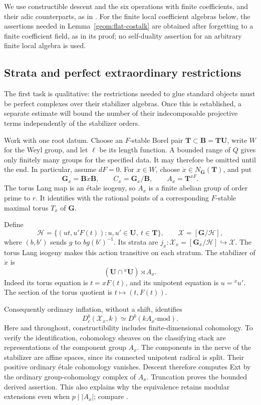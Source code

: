 We use constructible descent and the six operations with finite
coefficients, and their adic counterparts, as in
\cite{LaszloOlssonFinite,LaszloOlssonAdic}.  For the finite local
coefficient algebras below, the assertions needed in
Lemma~\ref{geom:flat-costalk} are obtained after forgetting to a
finite coefficient field, as in its proof; no self-duality assertion
for an arbitrary finite local algebra is used.

\subsection{Strata and perfect extraordinary restrictions}

The first task is qualitative: the restrictions needed to glue
standard objects must be perfect complexes over their stabilizer
algebras.  Once this is established, a separate estimate will bound
the number of their indecomposable projective terms independently
of the stabilizer orders.

Work with one root datum. Choose an \(F\)-stable Borel pair
\(\mathbf T\subset\mathbf B=\mathbf T\mathbf U\), write \(W\) for the
Weyl group, and let \(\ell\) be its length function. A bounded range of
\(Q\) gives only finitely many groups for the specified data. It may
therefore be omitted until the end. In particular, assume \(dF=0\).
For \(x\in W\), choose \(\dot x\in N_{\mathbf G}(\mathbf T)\), and put
\[
 \mathbf G_x=\mathbf B\dot x\mathbf B,
 \qquad C_x=\mathbf G_x/\mathbf B,
 \qquad A_x=\mathbf T^{xF}.
\]
The torus Lang map is an \'etale isogeny, so \(A_x\) is a finite abelian
group of order prime to \(r\). It identifies with the rational points
of a corresponding \(F\)-stable maximal torus \(T_x\) of \(\mathbf G\).

Define
\[
 \mathcal H=
 \{(ut,u'F(t)):u,u'\in\mathbf U,\ t\in\mathbf T\},
 \qquad \mathcal X=[\mathbf G/\mathcal H],
\]
where \((b,b')\) sends \(g\) to \(bg(b')^{-1}\).
Its strata are
\(j_x:\mathcal X_x=[\mathbf G_x/\mathcal H]\hookrightarrow\mathcal X\).
The torus Lang isogeny makes this action transitive on each stratum.
The stabilizer of \(\dot x\) is
\[
 (\mathbf U\cap{}^{\dot x}\mathbf U)\rtimes A_x.
\]
Indeed its torus equation is \(t=xF(t)\), and its unipotent equation is
\(u={} ^{\dot x}u'\). The section of the torus quotient is
\(t\mapsto(t,F(t))\).

Consequently ordinary inflation, without a shift, identifies
\begin{equation}\label{geom:stratum-category}
 D^b_c(\mathcal X_x,k)\simeq D^b(kA_x\text{-mod}).
\end{equation}
Here and throughout, constructibility includes finite-dimensional
cohomology. To verify the identification, cohomology sheaves on the
classifying stack are representations of the component group \(A_x\).
The components in the nerve of the stabilizer are affine spaces, since
its connected unipotent radical is split. Their positive ordinary
\'etale cohomology vanishes. Descent therefore computes Ext by the
ordinary group-cohomology complex of \(A_x\). Truncation proves the
bounded derived assertion. This also explains why the equivalence
retains modular extensions even when \(p\mid |A_x|\); compare
\cite[Lemma 2.1.1]{Eteve}.

